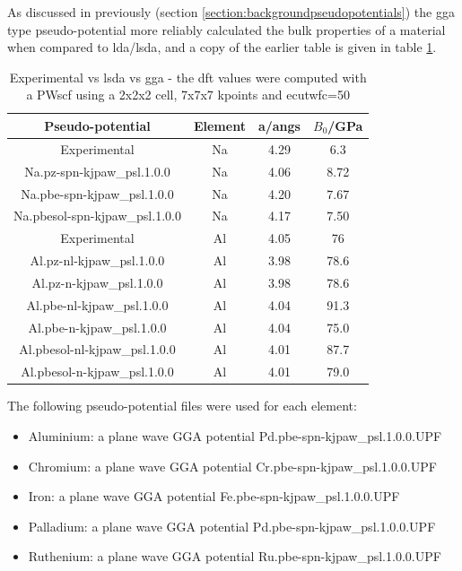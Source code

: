 As discussed in previously (section \ref{section:backgroundpseudopotentials}) the \acrshort{gga} type pseudo-potential more reliably calculated the bulk properties of a material when compared to \acrshort{lda}/\acrshort{lsda}, and a copy of the earlier table is given in table \ref{table:ggavslsdacopy}.

\FloatBarrier 
\begin{table}[h]
\begin{center}
\renewcommand{\arraystretch}{1.2}
\begin{tabular}{c c c c}
\hline\hline
Pseudo-potential & Element & a/angs & $B_0$/GPa \\
\hline\hline
Experimental    & Na      & 4.29\cite{periodictablena} & 6.3\cite{periodictablena} \\
Na.pz-spn-kjpaw\_psl.1.0.0 & Na & 4.06 & 8.72 \\
Na.pbe-spn-kjpaw\_psl.1.0.0 & Na & 4.20 & 7.67 \\
Na.pbesol-spn-kjpaw\_psl.1.0.0 & Na & 4.17 & 7.50 \\
Experimental    & Al      & 4.05\cite{periodictableal} & 76\cite{periodictableal} \\
Al.pz-nl-kjpaw\_psl.1.0.0 & Al & 3.98 & 78.6 \\
Al.pz-n-kjpaw\_psl.1.0.0 & Al & 3.98 & 78.6 \\
Al.pbe-nl-kjpaw\_psl.1.0.0 & Al & 4.04 & 91.3 \\
Al.pbe-n-kjpaw\_psl.1.0.0 & Al & 4.04 & 75.0 \\
Al.pbesol-nl-kjpaw\_psl.1.0.0 & Al & 4.01 & 87.7 \\
Al.pbesol-n-kjpaw\_psl.1.0.0 & Al & 4.01 & 79.0 \\
\hline\hline
\end{tabular}
\end{center}
\caption{Experimental vs \acrshort{lsda} vs \acrshort{gga} - the \acrshort{dft} values were computed with a PWscf\cite{quantumespresso} using a 2x2x2 cell, 7x7x7 kpoints and ecutwfc=50}
\label{table:ggavslsdacopy}
\end{table}

\FloatBarrier 

The following pseudo-potential files were used for each element:

\begin{itemize}
\item Aluminium: a plane wave GGA potential Pd.pbe-spn-kjpaw\_psl.1.0.0.UPF
\item Chromium: a plane wave GGA potential Cr.pbe-spn-kjpaw\_psl.1.0.0.UPF
\item Iron: a plane wave GGA potential Fe.pbe-spn-kjpaw\_psl.1.0.0.UPF 
\item Palladium: a plane wave GGA potential Pd.pbe-spn-kjpaw\_psl.1.0.0.UPF
\item Ruthenium: a plane wave GGA potential Ru.pbe-spn-kjpaw\_psl.1.0.0.UPF
\end{itemize}

